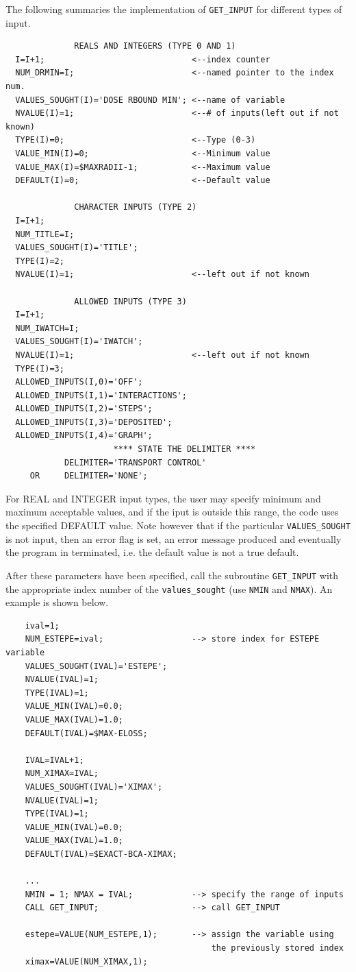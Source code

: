 \documentclass[12pt,twoside]{article}  %
\begin{document}
The following summaries the implementation of \verb+GET_INPUT+ for
different types of input.
\begin{verbatim}
              REALS AND INTEGERS (TYPE 0 AND 1)
  I=I+1;                              <--index counter
  NUM_DRMIN=I;                        <--named pointer to the index num.
  VALUES_SOUGHT(I)='DOSE RBOUND MIN'; <--name of variable
  NVALUE(I)=1;                        <--# of inputs(left out if not known)
  TYPE(I)=0;                          <--Type (0-3)
  VALUE_MIN(I)=0;                     <--Minimum value
  VALUE_MAX(I)=$MAXRADII-1;           <--Maximum value
  DEFAULT(I)=0;                       <--Default value

              CHARACTER INPUTS (TYPE 2)
  I=I+1;
  NUM_TITLE=I;
  VALUES_SOUGHT(I)='TITLE';
  TYPE(I)=2;
  NVALUE(I)=1;                        <--left out if not known

              ALLOWED INPUTS (TYPE 3)
  I=I+1;
  NUM_IWATCH=I;
  VALUES_SOUGHT(I)='IWATCH';
  NVALUE(I)=1;                        <--left out if not known
  TYPE(I)=3;
  ALLOWED_INPUTS(I,0)='OFF';
  ALLOWED_INPUTS(I,1)='INTERACTIONS';
  ALLOWED_INPUTS(I,2)='STEPS';
  ALLOWED_INPUTS(I,3)='DEPOSITED';
  ALLOWED_INPUTS(I,4)='GRAPH';
                      **** STATE THE DELIMITER ****
            DELIMITER='TRANSPORT CONTROL'
     OR     DELIMITER='NONE';
\end{verbatim}
For REAL and INTEGER input types, the user may specify minimum and
maximum acceptable values, and if the iput is outside this range,
the code uses the specified DEFAULT value. Note however that if the
particular \verb+VALUES_SOUGHT+ is not input, then an error flag is set,
an error message produced and eventually the program in terminated,
i.e. the default value is not a true default.

After these parameters have been specified, call the subroutine
\verb+GET_INPUT+ with the appropriate index number of the
\verb+values_sought+ (use \verb+NMIN+ and \verb+NMAX+).
An example is shown below.
\begin{verbatim}
    ival=1;
    NUM_ESTEPE=ival;                  --> store index for ESTEPE variable
    VALUES_SOUGHT(IVAL)='ESTEPE';
    NVALUE(IVAL)=1;
    TYPE(IVAL)=1;
    VALUE_MIN(IVAL)=0.0;
    VALUE_MAX(IVAL)=1.0;
    DEFAULT(IVAL)=$MAX-ELOSS;

    IVAL=IVAL+1;
    NUM_XIMAX=IVAL;
    VALUES_SOUGHT(IVAL)='XIMAX';
    NVALUE(IVAL)=1;
    TYPE(IVAL)=1;
    VALUE_MIN(IVAL)=0.0;
    VALUE_MAX(IVAL)=1.0;
    DEFAULT(IVAL)=$EXACT-BCA-XIMAX;

    ...
    NMIN = 1; NMAX = IVAL;            --> specify the range of inputs
    CALL GET_INPUT;                   --> call GET_INPUT

    estepe=VALUE(NUM_ESTEPE,1);       --> assign the variable using
                                          the previously stored index
    ximax=VALUE(NUM_XIMAX,1);
\end{verbatim}
\end{document}
